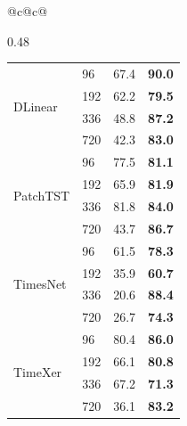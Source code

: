 \begin{table}[t]
\begin{tabular}{@{}c@{\hspace{12pt}}c@{}}
\begin{subtable}[t]{0.48\textwidth}
\begin{tabular}{llcc}
    \midrule
    \multirow{4}{*}{DLinear}
        & 96  & 67.4 & \textbf{90.0} \\
        & 192 & 62.2 & \textbf{79.5} \\
        & 336 & 48.8 & \textbf{87.2} \\
        & 720 & 42.3 & \textbf{83.0} \\
    \midrule
    \multirow{4}{*}{PatchTST}
        & 96  & 77.5 & \textbf{81.1} \\
        & 192 & 65.9 & \textbf{81.9} \\
        & 336 & 81.8 & \textbf{84.0} \\
        & 720 & 43.7 & \textbf{86.7} \\
    \midrule
    \multirow{4}{*}{TimesNet}
        & 96  & 61.5 & \textbf{78.3} \\
        & 192 & 35.9 & \textbf{60.7} \\
        & 336 & 20.6 & \textbf{88.4} \\
        & 720 & 26.7 & \textbf{74.3} \\
    \midrule
    \multirow{4}{*}{TimeXer}
        & 96  & 80.4 & \textbf{86.0} \\
        & 192 & 66.1 & \textbf{80.8} \\
        & 336 & 67.2 & \textbf{71.3} \\
        & 720 & 36.1 & \textbf{83.2} \\
    \bottomrule
    \end{tabular}
\end{subtable}
\end{tabular}
\end{table}
